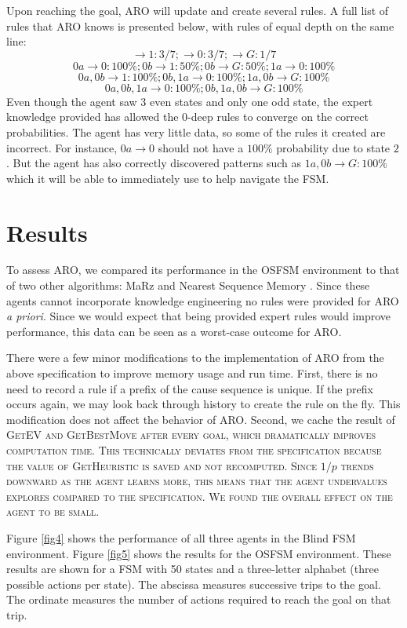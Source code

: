 \documentclass[letterpaper]{article} %
\begin{document}
Upon reaching the goal, ARO will update and create several rules. A full list of rules that ARO knows is presented below, with rules of equal depth on the same line:
$$\rightarrow 1: 3/7; \rightarrow 0: 3/7; \rightarrow G: 1/7$$
$$0a \rightarrow 0: 100\%; 0b \rightarrow 1: 50\%; 0b \rightarrow G: 50\%; 1a \rightarrow 0: 100\%$$
$$0a, 0b \rightarrow 1: 100\%; 0b, 1a \rightarrow 0: 100\%; 1a, 0b \rightarrow G: 100\%$$
$$0a, 0b, 1a \rightarrow 0: 100\%; 0b, 1a, 0b \rightarrow G: 100\%$$
Even though the agent saw 3 even states and only one odd state, the expert knowledge provided has allowed the 0-deep rules to converge on the correct probabilities. The agent has very little data, so some of the rules it created are incorrect. For instance, $0a \rightarrow 0$ should not have a $100\%$ probability due to state $2$. But the agent has also correctly discovered patterns such as $1a, 0b \rightarrow G: 100\%$ which it will be able to immediately use to help navigate the FSM.


\section{Results}

To assess ARO, we compared its performance in the OSFSM environment to
that of two other algorithms: MaRz \cite{Rodriguez17} and Nearest
Sequence Memory \cite{McCallumNSM95}. Since these agents cannot incorporate knowledge engineering no rules were provided for ARO \textit{a priori}. Since we would expect that being provided expert rules would improve performance, this data can be seen as a worst-case outcome for ARO.

There were a few minor modifications to the implementation of ARO from
the above specification to improve memory usage and run time. First,
there is no need to record a rule if a prefix of the cause sequence is
unique. If the prefix occurs again, we may look back through history
to create the rule on the fly. This modification does not affect the
behavior of ARO. Second, we cache the result of \scshape
GetEV \normalfont and \scshape GetBestMove \normalfont after every
goal, which dramatically improves computation time. This technically
deviates from the specification because the value of \scshape
GetHeuristic \normalfont is saved and not recomputed. Since $1/p$
trends downward as the agent learns more, this means that the agent
undervalues explores compared to the specification. We found the
overall effect on the agent to be small.

Figure \ref{fig4} shows the performance of all three agents in the
Blind FSM environment.  Figure \ref{fig5} shows the results for the
OSFSM environment.  These results are shown for a FSM with 50 states
and a three-letter alphabet (three possible actions per state).  The
abscissa measures successive trips to the goal.  The ordinate measures
the number of actions required to reach the goal on that trip.
\end{document}
